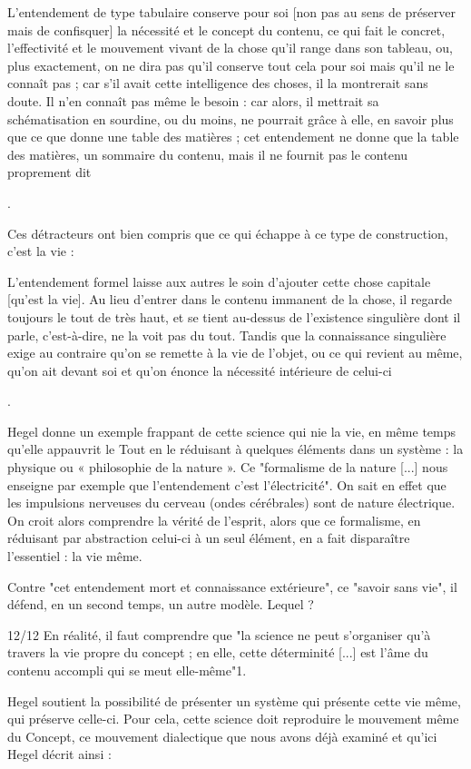     L’entendement de type tabulaire conserve pour soi [non pas au sens de préserver mais de confisquer] la nécessité et le concept du contenu, ce qui fait le concret, l’effectivité et le mouvement vivant de la chose qu’il range dans son tableau, ou, plus exactement, on ne dira pas qu’il conserve tout cela pour soi mais qu’il ne le connaît pas ; car s’il avait cette intelligence des choses, il la montrerait sans doute. Il n’en connaît pas même le besoin : car alors, il mettrait sa schématisation en sourdine, ou du moins, ne pourrait grâce à elle, en savoir plus que ce que donne une table des matières ; cet entendement ne donne que la table des matières, un sommaire du contenu, mais il ne fournit pas le contenu proprement dit

.

Ces détracteurs ont bien compris que ce qui échappe à ce type de construction, c’est la vie :

    L’entendement formel laisse aux autres le soin d’ajouter cette chose capitale [qu’est la vie]. Au lieu d’entrer dans le contenu immanent de la chose, il regarde toujours le tout de très haut, et se tient au-dessus de l’existence singulière dont il parle, c’est-à-dire, ne la voit pas du tout. Tandis que la connaissance singulière exige au contraire qu’on se remette à la vie de l’objet, ou ce qui revient au même, qu’on ait devant soi et qu’on énonce la nécessité intérieure de celui-ci

.


Hegel donne un exemple frappant de cette science qui nie la vie, en même temps qu’elle appauvrit le Tout en le réduisant à quelques éléments dans un système : la physique ou « philosophie de la nature ». Ce "formalisme de la nature [...] nous enseigne par exemple que l’entendement c’est l’électricité". On sait en effet que les impulsions nerveuses du cerveau (ondes cérébrales) sont de nature électrique. On croit alors comprendre la vérité de l’esprit, alors que ce formalisme, en réduisant par abstraction celui-ci à un seul élément, en a fait disparaître l’essentiel : la vie même.

Contre "cet entendement mort et connaissance extérieure", ce "savoir sans vie", il défend, en un second temps, un autre modèle. Lequel ?

12/12
En réalité, il faut comprendre que "la science ne peut s’organiser qu’à travers la vie propre du concept ; en elle, cette déterminité [...] est l’âme du contenu accompli qui se meut elle-même"1.

Hegel soutient la possibilité de présenter un système qui présente cette vie même, qui préserve celle-ci. Pour cela, cette science doit reproduire le mouvement même du Concept, ce mouvement dialectique que nous avons déjà examiné et qu’ici Hegel décrit ainsi :

